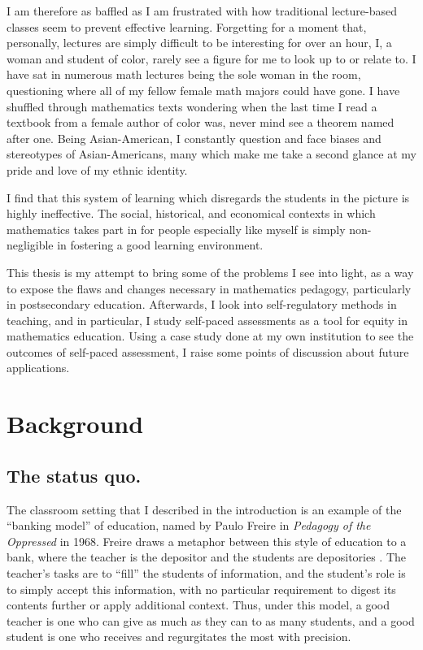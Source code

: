 I am therefore as baffled as I am frustrated with how traditional lecture-based classes seem to prevent effective learning. Forgetting for a moment that, personally, lectures are simply difficult to be interesting for over an hour, I, a woman and student of color, rarely see a figure for me to look up to or relate to. I have sat in numerous math lectures being the sole woman in the room, questioning where all of my fellow female math majors could have gone. I have shuffled through mathematics texts wondering when the last time I read a textbook from a female author of color was, never mind see a theorem named after one. Being Asian-American, I constantly question and face biases and stereotypes of Asian-Americans, many which make me take a second glance at my pride and love of my ethnic identity.

I find that this system of learning which disregards the students in the picture is highly ineffective. The social, historical, and economical contexts in which mathematics takes part in for people especially like myself is simply non-negligible in fostering a good learning environment.

This thesis is my attempt to bring some of the problems I see into light, as a way to expose the flaws and changes necessary in mathematics pedagogy, particularly in postsecondary education. Afterwards, I look into self-regulatory methods in teaching, and in particular, I study self-paced assessments as a tool for equity in mathematics education. Using a case study done at my own institution to see the outcomes of self-paced assessment, I raise some points of discussion about future applications.

\section{Background}
\subsection{The status quo.}

The classroom setting that I described in the introduction is an example of the ``banking model'' of education, named by Paulo Freire in {\it Pedagogy of the Oppressed} in 1968. Freire draws a metaphor between this style of education to a bank, where the teacher is the depositor and the students are depositories \citep{freire_pedagogy_2014}. The teacher's tasks are to ``fill'' the students of information, and the student's role is to simply accept this information, with no particular requirement to digest its contents further or apply additional context. Thus, under this model, a good teacher is one who can give as much as they can to as many students, and a good student is one who receives and regurgitates the most with precision.

